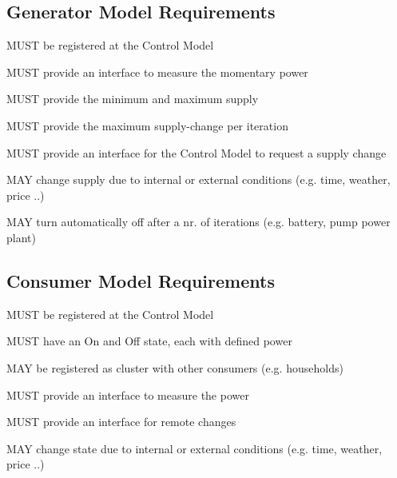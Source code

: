 \begin{description}
    \subsection{Generator Model Requirements}
        \item MUST be registered at the Control Model
        \item MUST provide an interface to measure the momentary power
        \item MUST provide the minimum and maximum supply
        \item MUST provide the maximum supply-change per iteration
        \item MUST provide an interface for the Control Model to request a supply change
        \item MAY change supply due to internal or external conditions (e.g. time, weather, price ..)
        \item MAY turn automatically off after a nr. of iterations (e.g. battery, pump power plant)
    \subsection{Consumer Model Requirements}
        \item MUST be registered at the Control Model
        \item MUST have an On and Off state, each with defined power
        \item MAY be registered as cluster with other consumers (e.g. households)
        \item MUST provide an interface to measure the power
        \item MUST provide an interface for remote changes
        \item MAY change state due to internal or external conditions  (e.g. time, weather, price ..)

\end{description}
